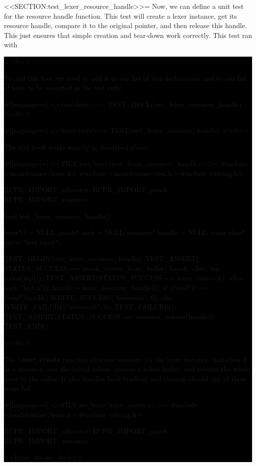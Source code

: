 <<SECTION:test_lexer_resource_handle>>=
Now, we can define a unit test for the resource handle function. This test will
create a lexer instance, get its resource handle, compare it to the original
pointer, and then release this handle. This just ensures that simple creation
and tear-down work correctly.  This test ran with
\colorbox{black}{%
>>@<<

To add this test, we need to add it to our list of test declarations and to our
list of tests to be executed in the test suite.

#[language=c]
<<test-decls>>=
TEST_DECL(test_lexer_resource_handle)
>>@<<

#[language=c]
<<lexer-tests>>=
TEST(test_lexer_resource_handle)
>>@<<

The test itself works exactly as described above.

#[language=c]
<<FILE:test/lexer/test_lexer_resource_handle.c>>=
#include <modelrunner/lexer.h>
#include <modelrunner/test.h>
#include <string.h>

RCPR_IMPORT_allocator;
RCPR_IMPORT_psock;
RCPR_IMPORT_resource;

bool test_lexer_resource_handle()
{
    lexer* l = NULL;
    psock* sock = NULL;
    resource* handle = NULL;
    const char* inp = "test input";

    TEST_BEGIN(test_lexer_resource_handle);
        TEST_ASSERT(
            STATUS_SUCCESS
                == psock_create_from_buffer(
                        &sock, alloc, inp, strlen(inp)));
        TEST_ASSERT(STATUS_SUCCESS == lexer_create(&l, alloc, sock, "test.x"));
        handle = lexer_resource_handle(l);
        if ((void*)l == (void*)handle)
        {
            WRITE_SUCCESS("testresult", 0);
        }
        else
        {
            WRITE_FAILURE("testresult", 0);
            TEST_FAILURE();
        }
        TEST_ASSERT(STATUS_SUCCESS == resource_release(handle));
    TEST_END();
}
>>@<<

The \verb/lexer_create/ function allocates memory for the lexer instance,
initializes it as a resource, sets the initial values, creates a token buffer,
and returns the whole mess to the caller. It also handles back-tracking and
cleanup should any of these steps fail.

#[language=c]
<<FILE:src/lexer/lexer_create.c>>=
#include <modelrunner/lexer.h>
#include <string.h>

RCPR_IMPORT_allocator;
RCPR_IMPORT_psock;
RCPR_IMPORT_resource;

<<lexer_create_decls>>

}
